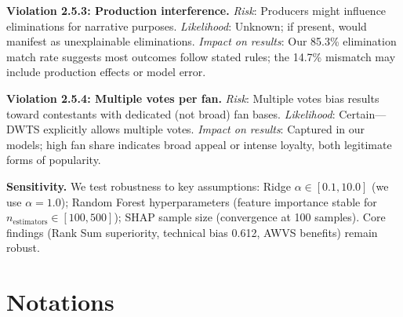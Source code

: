 \documentclass{mcmthesis}
\begin{document}
\textbf{Violation 2.5.3: Production interference.}
\textit{Risk}: Producers might influence eliminations for narrative purposes.
\textit{Likelihood}: Unknown; if present, would manifest as unexplainable eliminations.
\textit{Impact on results}: Our 85.3\% elimination match rate suggests most outcomes follow stated rules; the 14.7\% mismatch may include production effects or model error.

\textbf{Violation 2.5.4: Multiple votes per fan.}
\textit{Risk}: Multiple votes bias results toward contestants with dedicated (not broad) fan bases.
\textit{Likelihood}: Certain---DWTS explicitly allows multiple votes.
\textit{Impact on results}: Captured in our models; high fan share indicates broad appeal or intense loyalty, both legitimate forms of popularity.

\textbf{Sensitivity.}
We test robustness to key assumptions: Ridge $\alpha \in [0.1, 10.0]$ (we use $\alpha = 1.0$); Random Forest hyperparameters (feature importance stable for $n_{\text{estimators}} \in [100, 500]$); SHAP sample size (convergence at 100 samples). Core findings (Rank Sum superiority, technical bias 0.612, AWVS benefits) remain robust.

\section{Notations}
\end{document}
